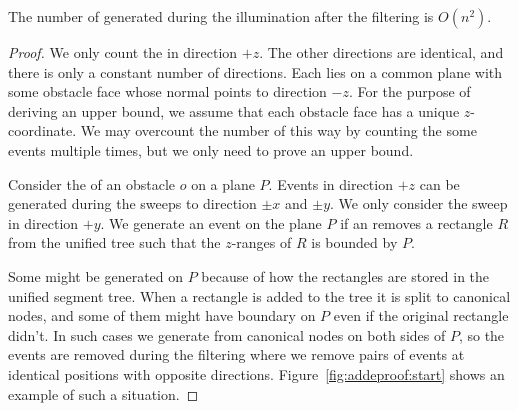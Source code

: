 \documentclass[english,gradu]{tktltiki2018}
\begin{document}
\begin{lem}\label{lem:adde3}The number of \addEs generated during the illumination after the filtering is $O(n^2)$.\end{lem}
\begin{proof}
We only count the \addEs in direction $+z$.
The other directions are identical, and there is only a constant number of directions.
Each \addE lies on a common plane with some obstacle face whose normal points to direction $-z$.
For the purpose of deriving an upper bound, we assume that each obstacle face has a unique $z$-coordinate.
We may overcount the number of \addEs this way by counting the some events multiple times, but we only need to prove an upper bound.

Consider the \obsEs of an obstacle $o$ on a plane $P$.
Events in direction $+z$ can be generated during the sweeps to direction $\pm x$ and $\pm y$.
We only consider the sweep in direction $+y$.
We generate an event on the plane $P$ if an \obsE removes a rectangle $R$ from the unified tree such that the $z$-ranges of $R$ is bounded by $P$.

Some \addEs might be generated on $P$ because of how the rectangles are stored in the unified segment tree.
When a rectangle is added to the tree it is split to canonical nodes, and some of them might have boundary on $P$ even if the original rectangle didn't.
In such cases we generate \addEs from canonical nodes on both sides of $P$, so the events are removed during the filtering where we remove pairs of events at identical positions with opposite directions.
Figure~\ref{fig:addeproof:start} shows an example of such a situation.


\end{proof}
\end{document}

